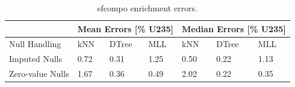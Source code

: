 \begin{table}[!ht]
  \centering
  \begin{tabular}{@{}l|lll|lll@{}}
    \toprule
                     & \multicolumn{3}{l|}{Mean Errors [\% U235]} & \multicolumn{3}{l}{Median Errors [\% U235]} \\ \toprule
    Null Handling    & kNN           & DTree          & MLL          & kNN            & DTree          & MLL    \\ \midrule
    Imputed Nulls    & 0.72          & 0.31           & 1.25         & 0.50           & 0.22           & 1.13   \\
    Zero-value Nulls & 1.67          & 0.36           & 0.49         & 2.02           & 0.22           & 0.35   \\ \bottomrule
  \end{tabular}
  \caption{sfcompo enrichment errors.}
  \label{tbl:sfcoenri}
\end{table}

